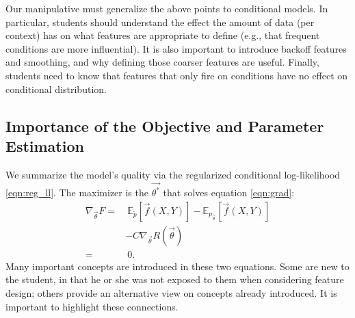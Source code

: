 \documentclass[11pt,letterpaper]{article}
\newcommand{\empirical}[0]{\ensuremath{\tilde{p}}}
\newcommand{\Data}[0]{\ensuremath{\mathcal{D}}}
\begin{document}
Our manipulative must generalize the above points to conditional models. In particular, students should 
understand the effect the amount of data (per context) has on what features are appropriate to define 
(e.g., that frequent conditions are more influential). It is also important to introduce backoff features 
and smoothing, and why defining those coarser features are useful. Finally, students need to know that 
features that only fire on conditions have no effect on conditional distribution.



\subsection{Importance of the Objective and Parameter Estimation} %

We summarize the model's quality via the regularized conditional
log-likelihood \eqref{eqn:reg_ll}.  
The maximizer is the $\vec{\theta^*}$ that solves equation \eqref{eqn:grad}:
\begin{equation}
\begin{aligned}
\nabla_{\vec{\theta}} F
 = &
\ \mathbb{E}_{\empirical{}}\left[\vec{f}(X,Y)\right] 
- \mathbb{E}_{{p_{\vec{\theta}}}}\left[\vec{f}(X,Y)\right]\\
 & - C \nabla_{\vec{\theta}}R(\vec{\theta})
\label{eqn:grad} \\
 = &\ 0.
\end{aligned}
\end{equation}
Many important concepts are introduced in these two equations. Some are new to the student, in that he or
she was not exposed to them when considering feature design; others provide an alternative view
on concepts already introduced. It is important to highlight these connections.
\end{document}

